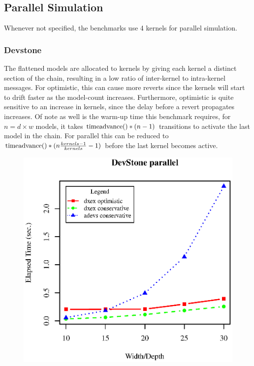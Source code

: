 \subsection{Parallel Simulation}
Whenever not specified, the benchmarks use 4 kernels for parallel simulation.
\subsubsection{Devstone}
The flattened models are allocated to kernels by giving each kernel a distinct section of the chain, resulting in a low ratio of inter-kernel to intra-kernel messages. For optimistic, this can cause more reverts since the kernels will start to drift faster as the model-count increases. Furthermore, optimistic is quite sensitive to an increase in kernels, since the delay before a revert propagates increases. Of note as well is the warm-up time this benchmark requires, for $n=d\times w$ models, it takes $\textup{timeadvance}()*(n-1)$ transitions to activate the last model in the chain. For parallel this can be reduced to $\textup{timeadvance}()*(n\frac{kernels-1}{kernels} -1)$ before the last kernel becomes active.\\
\begin{figure}[ltbh]
	\includegraphics[width=.5\textwidth]{fig/fig2.eps}
	\label{fig2.eps}
\end{figure}
